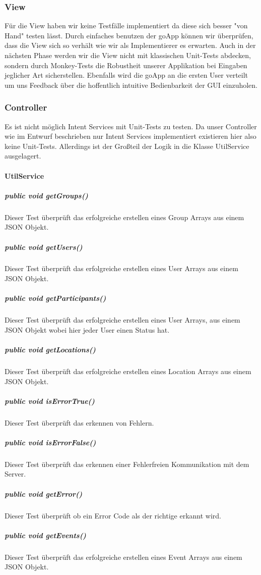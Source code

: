 \documentclass{scrartcl}
\begin{document}
	\subsubsection{View}
	Für die View haben wir keine Testfälle implementiert da diese sich besser "von Hand" testen lässt. Durch einfaches benutzen der goApp können wir überprüfen, dass die View sich so verhält wie wir als Implementierer es erwarten.
Auch in der nächsten Phase werden wir die View nicht mit klassischen Unit-Tests abdecken, sondern durch Monkey-Tests die Robustheit unserer Applikation bei Eingaben jeglicher Art sicherstellen.
Ebenfalls wird die goApp an die ersten User verteilt um uns Feedback über die hoffentlich intuitive Bedienbarkeit der GUI einzuholen.

	\subsubsection{Controller}
	Es ist nicht möglich Intent Services mit Unit-Tests zu testen.  Da unser Controller wie im Entwurf beschrieben nur Intent Services implementiert existieren hier also keine Unit-Tests.
Allerdings ist der Großteil der Logik in die Klasse UtilService ausgelagert. 

	\paragraph{UtilService}
	\subparagraph{public void getGroups()}
	Dieser Test überprüft das erfolgreiche erstellen eines Group Arrays aus einem JSON Objekt.
	\subparagraph{public void getUsers()}
	Dieser Test überprüft das erfolgreiche erstellen eines User Arrays aus einem JSON Objekt.
	\subparagraph{public void getParticipants()}
	Dieser Test überprüft das erfolgreiche erstellen eines User Arrays, aus einem JSON Objekt wobei hier jeder User einen Status hat.
	\subparagraph{public void getLocations()}
	Dieser Test überprüft das erfolgreiche erstellen eines Location Arrays aus einem JSON Objekt.
	\subparagraph{public void isErrorTrue()}
	Dieser Test überprüft das erkennen von Fehlern.
	\subparagraph{public void isErrorFalse()}
	Dieser Test überprüft das erkennen einer Fehlerfreien Kommunikation mit dem Server. 
	\subparagraph{public void getError()}
	Dieser Test überprüft ob ein Error Code als der richtige erkannt wird.
	\subparagraph{public void getEvents()}
	Dieser Test überprüft das erfolgreiche erstellen eines Event Arrays aus einem JSON Objekt.
	
\end{document}

